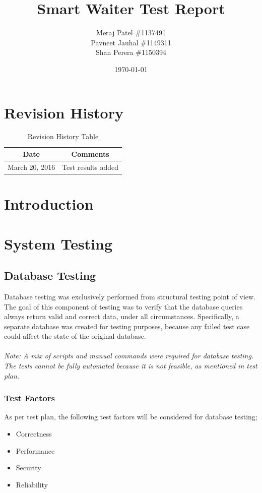 \documentclass[12pt, titlepage]{article}
\begin{document}
\title{Smart Waiter Test Report} 
\author{Meraj Patel \#1137491 \\ Pavneet Jauhal \#1149311\\ Shan Perera \#1150394}
\date{\today}
\maketitle

\tableofcontents 

\listoftables

\begin{table}[H]
\section*{Revision History}
\begin{tabular}{|c|c|}
\hline
\textbf{Date}  & \textbf{Comments} \\ \hline
March 20, 2016 & Test results added \\
\hline
\end{tabular}
\caption{Revision History Table}
\end{table}

\section{Introduction}

\section{System Testing} 
\subsection{Database Testing}
Database testing was exclusively performed from structural testing point of view. The goal of this component of testing was to verify that the database queries always return valid and correct data, under all circumstances. Specifically, a separate database was created for testing purposes, because any failed test case could affect the state of the original database.\\\\
\emph{Note: A mix of scripts and manual commands were required for database testing. The tests cannot be fully automated because it is not feasible, as mentioned in test plan.}
\subsubsection{Test Factors}
As per test plan, the following test factors will be considered for database testing;
\begin{itemize}
 \item Correctness
 \item Performance
 \item Security
 \item Reliability
 \end{itemize}
\end{document}
